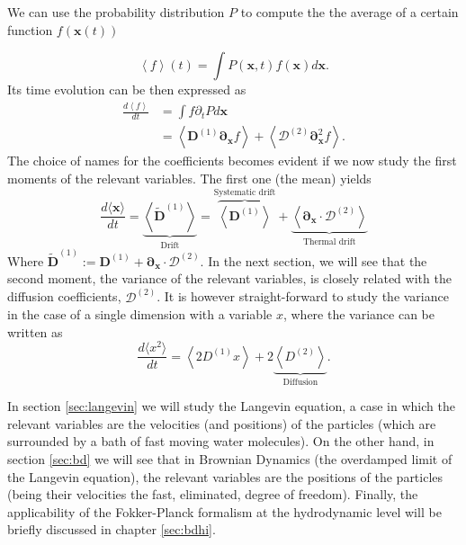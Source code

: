 \documentclass[ twoside,openright,titlepage,numbers=noenddot,%
headinclude,footinclude,cleardoublepage=empty,abstract=on,
BCOR=5mm,paper=a4,fontsize=11pt, dvipsnames
]{scrreprt}
\renewcommand{\vec}[1]{\bm{#1}}
\newcommand{\tens}[1]{\bm{\mathcal{#1}}}
\begin{document}
We can use the probability distribution $P$ to compute the the average of a certain function $f(\vec{x}(t))$

\begin{equation}
  \left\langle f\right\rangle(t) = \int {P(\vec{x},t) f(\vec{x}) d\vec{x}}.
\end{equation}
Its time evolution can be then expressed as
\begin{equation}
  \begin{aligned}
    \frac{d\left\langle f\right\rangle}{dt} &= \int{f\partial_tPd\vec{x}}\\
    &= \left\langle \vec{D}^{(1)} \vec{\partial}_{\vec{x}}f\right\rangle + \left\langle \tens{D}^{(2)}\vec\partial_{\vec{x}}^2f\right\rangle.
  \end{aligned}
\end{equation}
The choice of names for the coefficients becomes evident if we now study the first moments of the relevant variables. The first one (the mean) yields
\begin{equation}
  \label{eq:fpemean}  
  \frac{d\langle\vec{x}\rangle}{dt} = \underbrace{\left\langle \widetilde{\vec{D}}^{(1)}\right\rangle}_{\text{Drift}} = \overbrace{\left\langle \vec{D}^{(1)}\right\rangle}^{\text{Systematic drift}} + \underbrace{\left\langle \vec{\partial}_{\vec{x}}\cdot\tens{D}^{(2)}\right\rangle}_{\text{Thermal drift}}
\end{equation}
Where $\widetilde{\vec{D}}^{(1)} := \vec{D}^{(1)} + \vec{\partial}_{\vec{x}}\cdot\tens{D}^{(2)}$.
In the next section, we will see that the second moment, the variance of the relevant variables, is closely related with the diffusion coefficients, $\tens{D}^{(2)}$. It is however straight-forward to study the variance in the case of a single dimension with a variable $x$, where the variance can be written as
\begin{equation}
  \label{eq:fpevar}
  \frac{d\langle x^2\rangle}{dt} = \left\langle 2 D^{(1)}x\right\rangle + 2\underbrace{\left\langle D^{(2)}\right\rangle}_{\text{Diffusion}}.
\end{equation}

In section \ref{sec:langevin} we will study the Langevin equation, a case in which the relevant variables are the velocities (and positions) of the particles (which are surrounded by a bath of fast moving water molecules). On the other hand, in section \ref{sec:bd} we will see that in Brownian Dynamics (the overdamped limit of the Langevin equation), the relevant variables are the positions of the particles (being their velocities the fast, eliminated, degree of freedom). Finally, the applicability of the Fokker-Planck formalism at the hydrodynamic level will be briefly discussed in chapter \ref{sec:bdhi}.
\end{document}
